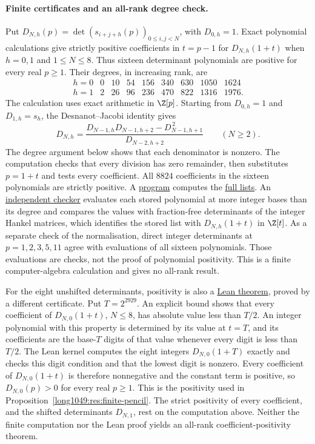 \paragraph{Finite certificates and an all-rank degree check.}
Put $D_{N,h}(p)=\det(s_{i+j+h}(p))_{0\le i,j<N}$, with $D_{0,h}=1$.
Exact polynomial calculations give strictly positive coefficients in
$t=p-1$ for $D_{N,h}(1+t)$ when $h=0,1$ and $1\le N\le8$.
Thus sixteen determinant polynomials are positive for every real $p\ge1$.
Their degrees, in increasing rank, are
\[
\begin{array}{c|rrrrrrrr}
h=0&0&10&54&156&340&630&1050&1624\\
h=1&2&26&96&236&470&822&1316&1976.
\end{array}
\]
The calculation uses exact arithmetic in $\Z[p]$. Starting from
$D_{0,h}=1$ and $D_{1,h}=s_h$, the Desnanot--Jacobi identity gives
\[
 D_{N,h}=
 \frac{D_{N-1,h}D_{N-1,h+2}-D_{N-1,h+1}^{\,2}}{D_{N-2,h+2}}
 \qquad(N\ge2).
\]
The degree argument below shows that each denominator is nonzero.
The computation checks that every division has zero remainder, then
substitutes $p=1+t$ and tests every coefficient. All $8824$ coefficients
in the sixteen polynomials are strictly positive. A
\href{https://github.com/wcook04/plectis-erdos/blob/4beca4ad0c00a626def9c73f2420e20ebf8d1968/computations/finite_coefficients_generate.py}{program}
computes the
\href{https://github.com/wcook04/plectis-erdos/blob/4beca4ad0c00a626def9c73f2420e20ebf8d1968/computations/finite_coefficients.json}{full lists}.
An
\href{https://github.com/wcook04/plectis-erdos/blob/4beca4ad0c00a626def9c73f2420e20ebf8d1968/computations/check_finite_coefficients.py}{independent checker}
evaluates each stored polynomial at more integer bases than its degree and
compares the values with fraction-free determinants of the integer Hankel
matrices, which identifies the stored list with $D_{N,h}(1+t)$ in $\Z[t]$.
As a separate check of the normalisation, direct integer determinants
at $p=1,2,3,5,11$ agree with evaluations of all sixteen polynomials.
Those evaluations are checks, not the proof of polynomial positivity.
This is a finite computer-algebra calculation and gives no all-rank result.

For the eight unshifted determinants, positivity is also a
\href{\laterepobase/lean/ErdosProblems/Erdos1049/PaperR20/HankelKroneckerCertificate.lean\#L458}{Lean theorem},
proved by a different certificate. Put $T=2^{2929}$. An explicit bound
shows that every coefficient of $D_{N,0}(1+t)$, $N\le8$, has absolute
value less than $T/2$. An integer polynomial with this property is
determined by its value at $t=T$, and its coefficients are the base-$T$
digits of that value whenever every digit is less than $T/2$. The Lean
kernel computes the eight integers $D_{N,0}(1+T)$ exactly and checks this
digit condition and that the lowest digit is nonzero. Every coefficient
of $D_{N,0}(1+t)$ is therefore nonnegative and the constant term is
positive, so $D_{N,0}(p)>0$ for every real $p\ge1$. This is the positivity
used in Proposition~\ref{long1049:res:finite-pencil}. The strict
positivity of every coefficient, and the shifted determinants $D_{N,1}$,
rest on the computation above.
Neither the finite computation nor the Lean proof yields an all-rank
coefficient-positivity theorem.

